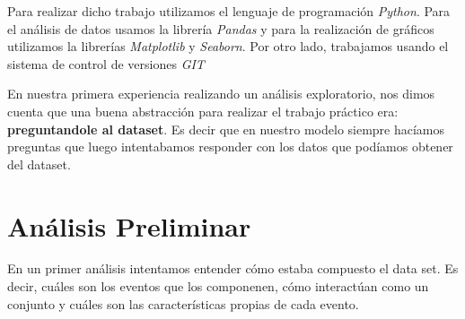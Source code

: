\documentclass[titlepage,a4paper]{article}
\begin{document}
	Para realizar dicho trabajo utilizamos el lenguaje de programación \textit{Python}. Para el análisis de datos usamos la librería \textit{Pandas} y para la realización de gráficos utilizamos la librerías \textit{Matplotlib }y \textit{Seaborn}. Por otro lado, trabajamos usando el sistema de control de versiones \textit{GIT}	
	
	En nuestra primera experiencia realizando un análisis exploratorio, nos dimos cuenta que una buena abstracción para realizar el trabajo práctico era: \textbf{preguntandole al dataset}. Es decir que en nuestro modelo siempre hacíamos preguntas que luego intentabamos responder con los datos que podíamos obtener del dataset. 
	
	\section{Análisis Preliminar}
	En un primer análisis intentamos entender cómo estaba compuesto el data set. Es decir, cuáles son los eventos que los componenen, cómo interactúan como un conjunto y cuáles son las características propias de cada evento. 
\end{document}
